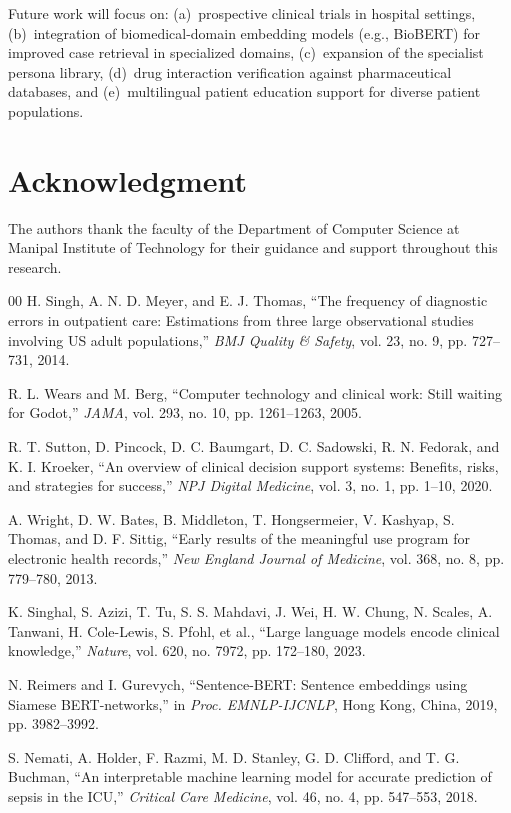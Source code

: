 \documentclass[conference]{IEEEtran}
\begin{document}
Future work will focus on: (a)~prospective clinical trials in hospital settings, (b)~integration of biomedical-domain embedding models (e.g., BioBERT) for improved case retrieval in specialized domains, (c)~expansion of the specialist persona library, (d)~drug interaction verification against pharmaceutical databases, and (e)~multilingual patient education support for diverse patient populations.

\section*{Acknowledgment}
The authors thank the faculty of the Department of Computer Science at Manipal Institute of Technology for their guidance and support throughout this research.

\begin{thebibliography}{00}
 H. Singh, A. N. D. Meyer, and E. J. Thomas, ``The frequency of diagnostic errors in outpatient care: Estimations from three large observational studies involving US adult populations,'' \textit{BMJ Quality \& Safety}, vol. 23, no. 9, pp. 727--731, 2014.

 R. L. Wears and M. Berg, ``Computer technology and clinical work: Still waiting for Godot,'' \textit{JAMA}, vol. 293, no. 10, pp. 1261--1263, 2005.

 R. T. Sutton, D. Pincock, D. C. Baumgart, D. C. Sadowski, R. N. Fedorak, and K. I. Kroeker, ``An overview of clinical decision support systems: Benefits, risks, and strategies for success,'' \textit{NPJ Digital Medicine}, vol. 3, no. 1, pp. 1--10, 2020.

 A. Wright, D. W. Bates, B. Middleton, T. Hongsermeier, V. Kashyap, S. Thomas, and D. F. Sittig, ``Early results of the meaningful use program for electronic health records,'' \textit{New England Journal of Medicine}, vol. 368, no. 8, pp. 779--780, 2013.

 K. Singhal, S. Azizi, T. Tu, S. S. Mahdavi, J. Wei, H. W. Chung, N. Scales, A. Tanwani, H. Cole-Lewis, S. Pfohl, et al., ``Large language models encode clinical knowledge,'' \textit{Nature}, vol. 620, no. 7972, pp. 172--180, 2023.

 N. Reimers and I. Gurevych, ``Sentence-BERT: Sentence embeddings using Siamese BERT-networks,'' in \textit{Proc. EMNLP-IJCNLP}, Hong Kong, China, 2019, pp. 3982--3992.

 S. Nemati, A. Holder, F. Razmi, M. D. Stanley, G. D. Clifford, and T. G. Buchman, ``An interpretable machine learning model for accurate prediction of sepsis in the ICU,'' \textit{Critical Care Medicine}, vol. 46, no. 4, pp. 547--553, 2018.


\end{thebibliography}
\end{document}

